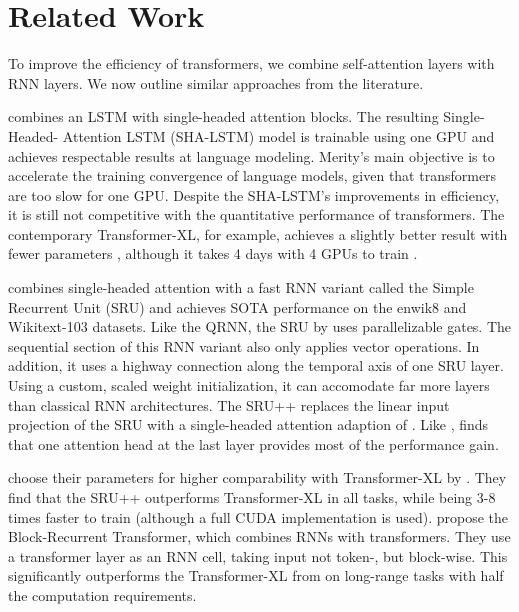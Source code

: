 \section{Related Work}
\label{sec:related_work}
To improve the efficiency of transformers, we combine self-attention
layers with RNN layers.  We now outline similar approaches from the
literature.

\citet{merity2019single} combines an LSTM with single-headed attention
blocks. The resulting Single-Headed-
Attention LSTM (SHA-LSTM) model is trainable using one GPU and
achieves respectable results at language modeling. Merity's main
objective is to accelerate the training convergence of language
models, given that transformers are too slow for one GPU.  Despite the
SHA-LSTM's improvements in efficiency, it is still not competitive
with the quantitative performance of transformers. The contemporary
Transformer-XL, for example, achieves a slightly better result with
fewer parameters \citep{dai-etal-2019-transformer}, although it takes
4 days with 4 GPUs to train \citep{lei2021attention}.

\citet{lei2021attention} combines single-headed attention with a fast RNN
variant called the Simple Recurrent Unit (SRU) and achieves SOTA
performance on the enwik8 and Wikitext-103 datasets. Like the QRNN,
the SRU by \citet{lei-etal-2018-simple} uses parallelizable gates. The
sequential section of this RNN variant also only applies vector
operations. In addition, it uses a highway connection along the temporal axis of one SRU
layer. Using a custom, scaled weight initialization,
it can accomodate far more layers than classical RNN architectures. The
SRU++ replaces the linear input projection of the SRU with a
single-headed attention adaption of \citet{transformer}. Like
\citet{merity2019single}, \citet{lei2021attention} finds that one
attention head at the last layer provides most of the performance
gain.

\citet{lei2021attention} choose their parameters for higher
comparability with Transformer-XL by
\citet{dai-etal-2019-transformer}.  They find that the SRU++
outperforms Transformer-XL in all tasks, while being 3-8 times faster
to train (although a full CUDA implementation is used).
\citet{Hutchins2022BlockRnnTf} propose the Block-Recurrent Transformer,
which combines RNNs with transformers. They use a
transformer layer as an RNN cell, taking input not token-, but
block-wise. This significantly outperforms the Transformer-XL from
\citet{dai-etal-2019-transformer} on long-range tasks with half the
computation requirements.

